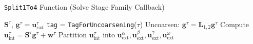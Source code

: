 \begin{algorithm}[h]
    \caption{\texttt{Split1To4} Function (Solve Stage Family Callback)}
    \begin{algorithmic}[0]
        \Require $\textbf{S}^{\tau}$, $\textbf{g}^{\tau} = \textbf{u}^{\tau}_{ext}$
        \State \texttt{tag} = \texttt{TagForUncoarsening}($\tau$)
            \State Uncoarsen: $\textbf{g}^{\tau} = \textbf{L}_{1,2} \textbf{g}^{\tau}$
        \EndIf
        \State Compute $\textbf{u}^{\tau}_{\text{int}} = \textbf{S}^{\tau} \textbf{g}^{\tau} + \textbf{w}^{\tau}$
        \State Partition $\textbf{u}^{\tau}_{\text{int}}$ into $\textbf{u}^{\alpha}_{\text{ext}}, \textbf{u}^{\beta}_{\text{ext}}, \textbf{u}^{\gamma}_{\text{ext}}, \textbf{u}^{\omega}_{\text{ext}}$
    \end{algorithmic}
    \label{alg:solve_split}
\end{algorithm}